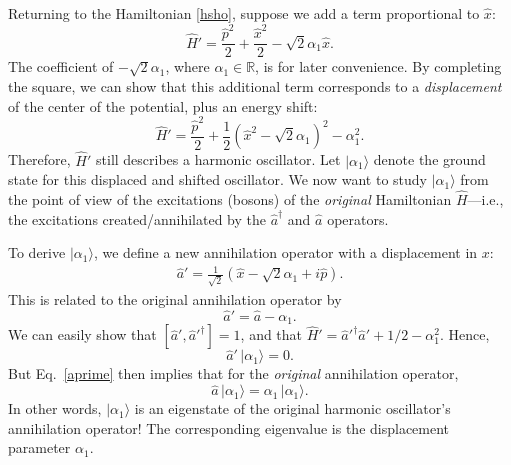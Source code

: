 \documentclass[pra,12pt]{revtex4}
\begin{document}
Returning to the Hamiltonian \eqref{hsho}, suppose we add a term
proportional to $\hat{x}$:
\begin{equation}
  \hat{H}' = \frac{\hat{p}^2}{2} + \frac{\hat{x}^2}{2} - \sqrt{2}\alpha_1\hat{x}.
  \label{hshift}
\end{equation}
The coefficient of $-\sqrt{2}\alpha_1$, where $\alpha_1 \in
\mathbb{R}$, is for later convenience.  By completing the square, we
can show that this additional term corresponds to a
\textit{displacement} of the center of the potential, plus an energy
shift:
\begin{equation}
  \hat{H}' = \frac{\hat{p}^2}{2} + \frac{1}{2}\left(\hat{x}^2 - \sqrt{2}\alpha_1\right)^2 - \alpha_1^2.
\end{equation}
Therefore, $\hat{H}'$ still describes a harmonic oscillator.  Let
$|\alpha_1\rangle$ denote the ground state for this displaced and
shifted oscillator.  We now want to study $|\alpha_1\rangle$ from the
point of view of the excitations (bosons) of the \textit{original}
Hamiltonian $\hat{H}$---i.e., the excitations created/annihilated by
the $\hat{a}^\dagger$ and $\hat{a}$ operators.

To derive $|\alpha_1\rangle$, we define a new annihilation operator
with a displacement in $x$:
\begin{align}
  \hat{a}' = \frac{1}{\sqrt{2}}\left(\hat{x} - \sqrt{2}\alpha_1 + i \hat{p}\right).
\end{align}
This is related to the original annihilation operator by
\begin{equation}
  \hat{a}' = \hat{a} - \alpha_1.
  \label{aprime}
\end{equation}
We can easily show that $[\hat{a}',\hat{a}'^\dagger] = 1$, and that
$\hat{H}' = \hat{a}'^\dagger \hat{a}' + 1/2 - \alpha_1^2$.  Hence,
\begin{equation}
  \hat{a}' \, |\alpha_1 \rangle = 0.
\end{equation}
But Eq.~\eqref{aprime} then implies that for the \textit{original}
annihilation operator,
\begin{equation}
  \hat{a}\, |\alpha_1\rangle = \alpha_1 \,|\alpha_1\rangle.
  \label{aeigenv}
\end{equation}
In other words, $|\alpha_1\rangle$ is an eigenstate of the original
harmonic oscillator's annihilation operator!  The corresponding
eigenvalue is the displacement parameter $\alpha_1$.
\end{document}
